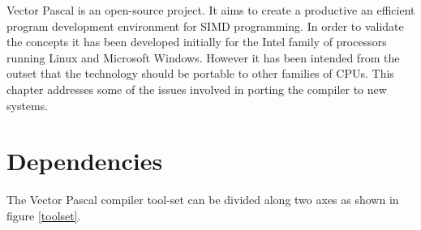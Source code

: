 \label{porting} Vector Pascal is an open-source project. It aims
to create a productive an efficient program development environment
for SIMD programming. In order to validate the concepts it has been
developed initially for the Intel family of processors running Linux
and Microsoft Windows. However it has been intended from the outset
that the technology should be portable to other families of CPUs.
This chapter addresses some of the issues involved in porting the
compiler to new systems.


\section{Dependencies}

The Vector Pascal compiler tool-set can be divided along two axes
as shown in figure \ref{toolset}. 


